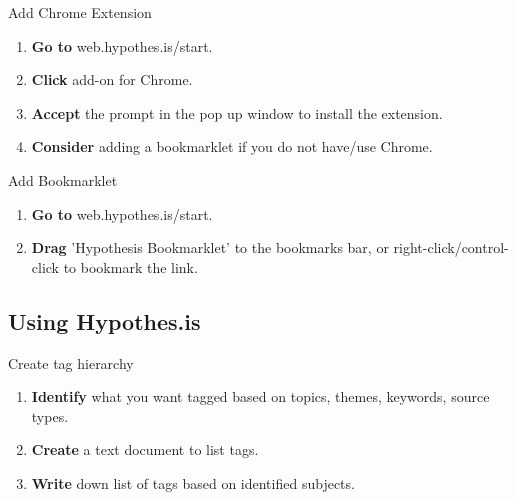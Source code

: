 \documentclass[10pt,a4paper]{article}
\begin{document}
\begin{textbox}{Add Chrome Extension}
 

  

\begin{enumerate}
\item \textbf{Go to} web.hypothes.is/start. 
\item \textbf{Click} add-on for Chrome.
\item \textbf{Accept} the prompt in the pop up window to install the extension. 
\item \textbf{Consider} adding a bookmarklet if you do not have/use Chrome.
\end{enumerate}

\end{textbox}

\begin{textbox}{Add Bookmarklet}
 

  

\begin{enumerate}
\item \textbf{Go to} web.hypothes.is/start. 
\item \textbf{Drag} 'Hypothesis Bookmarklet' to the bookmarks bar, or right-click/control-click to bookmark the link.
\end{enumerate}

\end{textbox}

\subsection{Using Hypothes.is}

\begin{textbox}{Create tag hierarchy}
 

  

\begin{enumerate}
\item \textbf{Identify} what you want tagged based on topics, themes, keywords, source types. 
\item \textbf{Create} a text document to list tags.
\item \textbf{Write} down list of tags based on identified subjects.
\end{enumerate}

\end{textbox}
\end{document}
